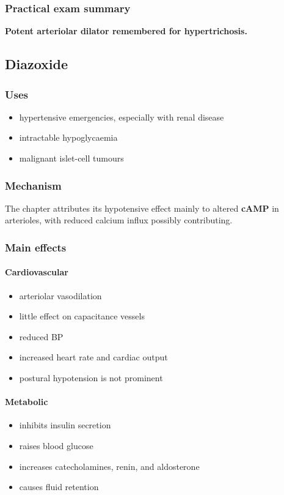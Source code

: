 \documentclass[11pt,a4paper]{article}
\begin{document}
\subsubsection*{Practical exam summary}

\textbf{Potent arteriolar dilator remembered for hypertrichosis.}

\subsection{Diazoxide}

\subsubsection*{Uses}
\begin{itemize}
    \item hypertensive emergencies, especially with renal disease
    \item intractable hypoglycaemia
    \item malignant islet-cell tumours
\end{itemize}

\subsubsection*{Mechanism}

The chapter attributes its hypotensive effect mainly to altered \textbf{cAMP} in arterioles, with reduced calcium influx possibly contributing.

\subsubsection*{Main effects}

\paragraph{Cardiovascular}
\begin{itemize}
    \item arteriolar vasodilation
    \item little effect on capacitance vessels
    \item reduced BP
    \item increased heart rate and cardiac output
    \item postural hypotension is not prominent
\end{itemize}

\paragraph{Metabolic}
\begin{itemize}
    \item inhibits insulin secretion
    \item raises blood glucose
    \item increases catecholamines, renin, and aldosterone
    \item causes fluid retention
\end{itemize}
\end{document}
